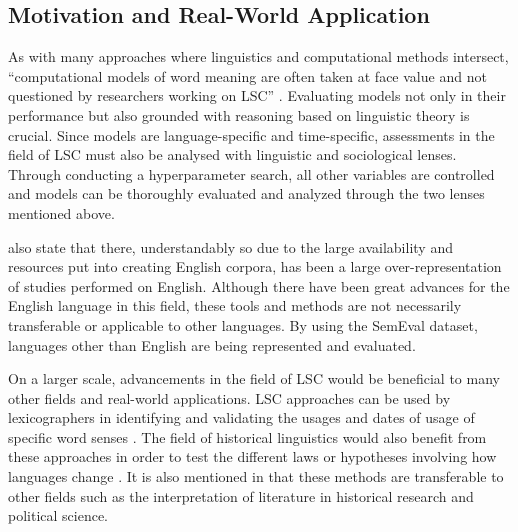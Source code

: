 
\subsection{Motivation and Real-World Application}

As with many approaches where linguistics and computational methods intersect, “computational models of word meaning are often taken at face value and not questioned by researchers working on LSC” \citep{hengchen2021challenges}. Evaluating models not only in their performance but also grounded with reasoning based on linguistic theory is crucial. Since models are language-specific and time-specific, assessments in the field of LSC must also be analysed with linguistic and sociological lenses. Through conducting a hyperparameter search, all other variables are controlled and models can be thoroughly evaluated and analyzed through the two lenses mentioned above. 

\citet{hengchen2021challenges} also state that there, understandably so due to the large availability and resources put into creating English corpora, has been a large over-representation of studies performed on English. Although there have been great advances for the English language in this field, these tools and methods are not necessarily transferable or applicable to other languages. By using the SemEval dataset, languages other than English are being represented and evaluated. 

On a larger scale, advancements in the field of LSC would be beneficial to many other fields and real-world applications. LSC approaches can be used by lexicographers in identifying and validating the usages and dates of usage of specific word senses \citep{lau-etal-2012-word, falk-etal-2014-non, klosa-2018-newgerman}. The field of historical linguistics would also benefit from these approaches in order to test the different laws or hypotheses involving how languages change \citep{hamilton-etal-2016-diachronic, Xu2015ACE}. It is also mentioned in \citet{hengchen2021challenges} that these methods are transferable to other fields such as the interpretation of literature in historical research and political science.  


